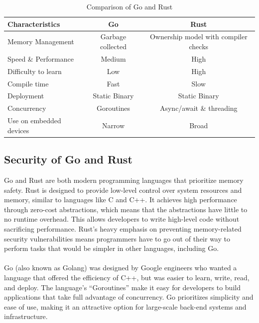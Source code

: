 \documentclass{dclass}
\begin{document}
\begin{table}[h!]
\centering
\vspace{0.2cm}
\begin{tabular}{|l|c|c|}
\hline
\textbf{Characteristics} & \textbf{Go} & \textbf{Rust} \\
\hline
Memory Management & Garbage collected & Ownership model with compiler checks \\
\hline
Speed \& Performance & Medium & High \\
\hline
Difficulty to learn & Low & High \\
\hline
Compile time & Fast & Slow \\
\hline
Deployment & Static Binary & Static Binary \\
\hline
Concurrency & Goroutines & Async/await \& threading \\
\hline
Use on embedded devices & Narrow & Broad \\
\hline
\end{tabular}
\caption{Comparison of Go and Rust}
\label{tab:comparison}
\end{table}

\subsection{Security of Go and Rust}

Go and Rust are both modern programming languages that prioritize memory safety. Rust is designed to provide low-level control over system resources and memory, similar to languages like C and C++. It achieves high performance through zero-cost abstractions, which means that the abstractions have little to no runtime overhead. This allows developers to write high-level code without sacrificing performance. Rust’s heavy emphasis on preventing memory-related security vulnerabilities means programmers have to go out of their way to perform tasks that would be simpler in other languages, including Go.\\\\
Go (also known as Golang) was designed by Google engineers who wanted a language that offered the efficiency of C++, but was easier to learn, write, read, and deploy. The language’s “Goroutines” make it easy for developers to build applications that take full advantage of concurrency. Go prioritizes simplicity and ease of use, making it an attractive option for large-scale back-end systems and infrastructure.
\end{document}
